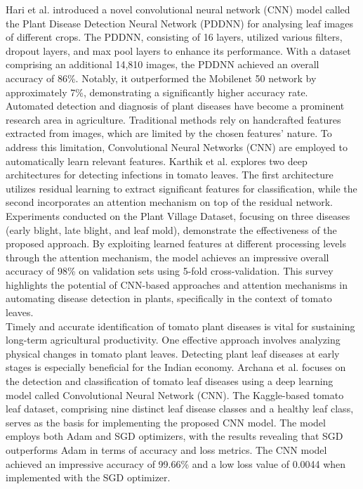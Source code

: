 \documentclass[conference]{IEEEtran}
\begin{document}
Hari et al. \cite{8899748} introduced a novel convolutional neural network (CNN) model called the Plant Disease Detection Neural Network (PDDNN) for analysing leaf images of different crops. The PDDNN, consisting of 16 layers, utilized various filters, dropout layers, and max pool layers to enhance its performance. With a dataset comprising an additional 14,810 images, the PDDNN achieved an overall accuracy of 86\%. Notably, it outperformed the Mobilenet 50 network by approximately 7\%, demonstrating a significantly higher accuracy rate.\\

Automated detection and diagnosis of plant diseases have become a prominent research area in agriculture. Traditional methods rely on handcrafted features extracted from images, which are limited by the chosen features' nature. To address this limitation, Convolutional Neural Networks (CNN) are employed to automatically learn relevant features. Karthik et al. \cite{karthik2020attention} explores two deep architectures for detecting infections in tomato leaves. The first architecture utilizes residual learning to extract significant features for classification, while the second incorporates an attention mechanism on top of the residual network. Experiments conducted on the Plant Village Dataset, focusing on three diseases (early blight, late blight, and leaf mold), demonstrate the effectiveness of the proposed approach. By exploiting learned features at different processing levels through the attention mechanism, the model achieves an impressive overall accuracy of 98\% on validation sets using 5-fold cross-validation. This survey highlights the potential of CNN-based approaches and attention mechanisms in automating disease detection in plants, specifically in the context of tomato leaves.\\

Timely and accurate identification of tomato plant diseases is vital for sustaining long-term agricultural productivity. One effective approach involves analyzing physical changes in tomato plant leaves. Detecting plant leaf diseases at early stages is especially beneficial for the Indian economy. Archana et al. \cite{10157203} focuses on the detection and classification of tomato leaf diseases using a deep learning model called Convolutional Neural Network (CNN). The Kaggle-based tomato leaf dataset, comprising nine distinct leaf disease classes and a healthy leaf class, serves as the basis for implementing the proposed CNN model. The model employs both Adam and SGD optimizers, with the results revealing that SGD outperforms Adam in terms of accuracy and loss metrics. The CNN model achieved an impressive accuracy of 99.66\% and a low loss value of 0.0044 when implemented with the SGD optimizer.\\
\end{document}

